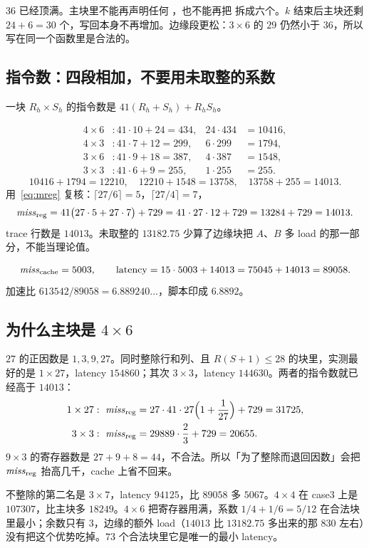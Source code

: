 $36$ 已经顶满。主块里不能再声明任何 ，也不能再把  拆成六个。$k$ 结束后主块还剩 $24+6=30$ 个，写回本身不再增加。边缘段更松：$3\times6$ 的 $29$ 仍然小于 $36$，所以写在同一个函数里是合法的。

\subsection{指令数：四段相加，不要用未取整的系数}

一块 $R_h\times S_h$ 的指令数是 $41(R_h+S_h)+R_h S_h$。

\begin{align*}
4\times6&: 41\cdot10+24=434, & 24\cdot434&=10416,\\
4\times3&: 41\cdot7+12=299, & 6\cdot299&=1794,\\
3\times6&: 41\cdot9+18=387, & 4\cdot387&=1548,\\
3\times3&: 41\cdot6+9=255, & 1\cdot255&=255.
\end{align*}
\[
10416+1794=12210,\quad 12210+1548=13758,\quad 13758+255=14013.
\]
用~\eqref{eq:mreg} 复核：$\lceil27/6\rceil=5$，$\lceil27/4\rceil=7$，
\[
\mathit{miss}_{\mathrm{reg}}=41\bigl(27\cdot5+27\cdot7\bigr)+729=41\cdot27\cdot12+729=13284+729=14013.
\]
trace 行数是 $14013$。未取整的 $13182.75$ 少算了边缘块把 $A$、$B$ 多 load 的那一部分，不能当理论值。

\[
\mathit{miss}_{\mathrm{cache}}=5003,\qquad \mathrm{latency}=15\cdot5003+14013=75045+14013=89058.
\]
加速比 $613542/89058=6.889240\ldots$，脚本印成 $6.8892$。

\subsection{为什么主块是 \texorpdfstring{$4\times6$}{4x6}}

$27$ 的正因数是 $1,3,9,27$。同时整除行和列、且 $R(S+1)\le 28$ 的块里，实测最好的是 $1\times27$，latency $154860$；其次 $3\times3$，latency $144630$。两者的指令数就已经高于 $14013$：
\begin{align*}
1\times27&:\ \mreg=27\cdot41\cdot27\Bigl(1+\frac1{27}\Bigr)+729=31725,\\
3\times3&:\ \mreg=29889\cdot\frac23+729=20655.
\end{align*}
$9\times3$ 的寄存器数是 $27+9+8=44$，不合法。所以「为了整除而退回因数」会把 $\mathit{miss}_{\mathrm{reg}}$ 抬高几千，cache 上省不回来。

不整除的第二名是 $3\times7$，latency $94125$，比 $89058$ 多 $5067$。$4\times4$ 在 case3 上是 $107307$，比主块多 $18249$。$4\times6$ 把寄存器用满，系数 $1/4+1/6=5/12$ 在合法块里最小；余数只有 $3$，边缘的额外 load（$14013$ 比 $13182.75$ 多出来的那 $830$ 左右）没有把这个优势吃掉。$73$ 个合法块里它是唯一的最小 latency。

